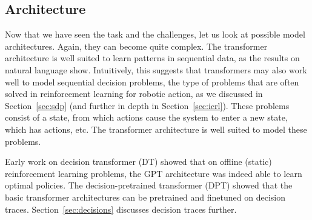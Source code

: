





\subsection{Architecture}
Now that we have seen the task and the challenges, let us look at possible model architectures. Again, they can become quite complex.
The transformer architecture is well suited to learn patterns in sequential data, as the  results on natural language show.  Intuitively, this suggests that transformers may also work well to model sequential decision problems, the type of problems that are often solved in reinforcement learning for robotic action, as we discussed in Section~\ref{sec:sdp} (and further in depth in Section~\ref{sec:icrl}). These problems consist of a state, from which actions cause the system to enter a new state, which has actions, etc. The transformer architecture is well suited to model these problems.

Early work on decision transformer (DT) \citep{chen2021decision,janner2021offline} showed that on offline (static) reinforcement learning  problems, the GPT architecture was indeed able to learn optimal policies.   The decision-pretrained  transformer (DPT) \citet{lee2023supervised,wang2024transformers} showed that the basic transformer architectures can  be pretrained and finetuned on decision  traces.  Section~\ref{sec:decisions} discusses decision traces further.  

